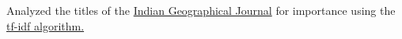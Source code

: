 {Analyzed the titles of the \href{https://igschennai.org/IGJ.php}{Indian Geographical Journal} for importance using the \href{https://en.wikipedia.org/wiki/Tf-idf}{tf-idf algorithm.}}
